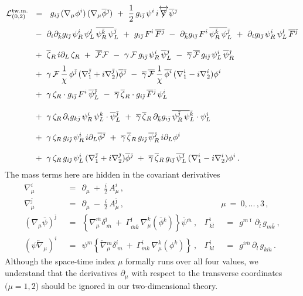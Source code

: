 \documentclass[12pt]{article}
\newcommand{\p}{\partial}
\newcommand{\ov}{\overline}
\newcommand{\mc}[1]{\mathcal{#1}}
\def\slashed#1{\setbox0=\hbox{$#1$}             %
   \dimen0=\wd0                                 %
   \setbox1=\hbox{/} \dimen1=\wd1               %
   \ifdim\dimen0>\dimen1                        %
      \rlap{\hbox to \dimen0{\hfil/\hfil}}      %
      #1                                        %
   \else                                        %
      \rlap{\hbox to \dimen1{\hfil$#1$\hfil}}   %
      /                                         %
   \fi}                                        %
\newcommand{\bzr}{\ov{\zeta}{}_R}
\newcommand{\zr}{\zeta_R}
\newcommand{\bgamma}{\ov{\gamma}}
\newcommand{\bpsi}{\ov{\psi}{}}
\newcommand{\bphi}{\ov{\phi}{}}
\newcommand{\ff}{\mc{F}}
\newcommand{\bff}{\ov{\mc{F}}}
\newcommand{\bi}{{\bar \imath}}
\newcommand{\bj}{{\bar \jmath}}
\newcommand{\bk}{{\bar k}}
\newcommand{\bl}{{\bar l}}
\newcommand{\bm}{{\bar m}}
\begin{document}
\begin{align}
%
\notag
	\mc{L}_{(0,2)}^\text{tw.m.} & ~~=~~ 
	g_{i\bj}\,(\nabla_\mu \phi^i)\, (\nabla_\mu\ov{\phi}{}^\bj)
	~+~ \frac{1}{2}\, g_{i\bj}\, \psi^i\, i\overleftrightarrow{\slashed{\nabla}} \ov{\psi}{}^\bj
	\\[1mm]
%
\notag
	&~
	~-~ \p_i\p_\bk g_{l\bj}\, \psi^i_{R}\, \psi^l_{L}\, \ov{\psi^\bk_{R}\, \psi}{}^\bj_{L}
	~+~ g_{i\bj}\, F^i\,\ov{F}{}^\bj
	~-~ \p_\bk g_{i\bj}\, F^i\, \ov{\psi_R^\bk\, \psi}{}_L^\bj
	~+~ \p_i g_{l\bj}\, \psi_R^i\, \psi_L^l\, \ov{F}{}^\bj
	\\[3mm]
%
\notag
	&~
	~+~ \bzr\, i\p_L\, \zr ~+~ \bff \ff 
	~-~ \gamma\, \ff\, g_{i\bj}\, \psi_R^i\, \bpsi_L^\bj 
	~-~ \bgamma\, \bff\, g_{i\bj}\, \psi_L^i\, \bpsi_R^\bj
	\\[1mm]
%
\label{geomlin}
	&~
	~+~ \gamma\, \ff\, \frac{1}{\chi}\,\phi^\bj\, (\nabla_1^\bj + i \nabla_2^\bj) \bphi^\bj
	~-~ \bgamma\, \bff\, \frac{1}{\chi}\,\bphi^\bi\, (\nabla_1^i - i \nabla_2^i) \phi^i
	\\[1mm]
%
\notag
	&~
	~+~ \gamma\,\zr\cdot g_{i\bj}\, F^i\, \bpsi_L^\bj
	~-~ \bgamma\, \bzr\cdot g_{i\bj}\, \ov{F}{}^\bj\, \psi_L^i
	\\[3mm]
%
\notag
	&~
	~+~ \gamma\, \zr\, \p_i g_{k\bj}\, \psi_R^i\, \psi_L^k \cdot \bpsi_L^\bj
	~+~ \bgamma\, \bzr\, \p_\bk g_{i\bj}\, \ov{\psi_R^\bj\, \psi}{}_L^\bk \cdot \psi_L^i
	\\[3mm]
%	
\notag
	&~
	~+~ \gamma\, \zr\, g_{i\bj}\, \psi_R^i\, i\p_L \bphi^\bj
	~+~ \bgamma\, \bzr\, g_{i\bj}\, \bpsi_R^\bj\, i\p_L \phi^i
	\\[3mm]
%
\notag
	&~
	~+~ \gamma\, \zr\, g_{i\bj}\, \psi_L^i\, (\nabla_1^\bj + i\nabla_2^\bj) \bphi^\bj
	~+~ \bgamma\, \bzr\, g_{i\bj}\, \bpsi_L^\bj\, (\nabla_1^i - i\nabla_2^i) \phi^i
	\,.
\end{align}
	The mass terms here are hidden in the covariant derivatives
\begin{align*}
%
	\nabla_\mu^i & ~~=~~ \p_\mu ~+~ \frac{i}{2}\,A_\mu^i\,,  \\[3mm]
%
	\nabla_\mu^\bj & ~~=~~ \p_\mu ~-~ \frac{i}{2}\,A_\mu^\bj \,,
	&& \!\!\!\!\!\!\! \mu ~=~ 0,...\,,3\,,
	\\[3mm]
%
	(\nabla_\mu \ov{\psi})^\bj & ~~=~~ \left\{ \nabla_\mu^\bm \delta^\bj_{\ \bm} ~+~
						\Gamma_{\bm\bk}^\bj\, \nabla_\mu^\bk (\ov{\phi}{}^\bk) \right\} \ov{\psi}{}^\bm~,
	& \Gamma^\bi_{\bk\bl} & ~~=~~ g^{m\bi}\,\p_\bl\, g_{m\bk}~,
	\\[3mm]
%
	(\psi \overleftarrow{\nabla}{}_\mu)^i & ~~=~~ 
			\psi^m \left\{ \overleftarrow{\nabla}{}_\mu^m \delta^i_{\ m} ~+~
						\Gamma^i_{mk}\, \nabla_\mu^k (\phi^k) \right\}~,
	& \Gamma^i_{kl} & ~~=~~ g^{i\bm}\, \p_l\, g_{k\bm}\,.
\end{align*}
	Although the space-time index $\mu$ formally runs over all four values, we understand
	that the derivatives $ \p_\mu $ with respect to the transverse coordinates 
	$(\mu=1,2$) should be ignored in our two-dimensional
	theory.
\end{document}
